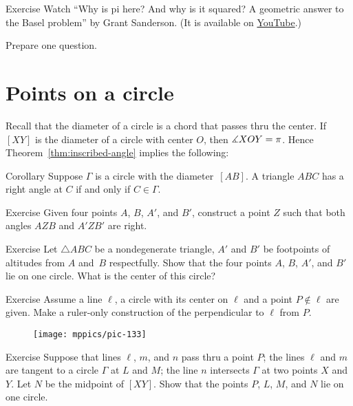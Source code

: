 \begin{thm}{Exercise}
Watch ``Why is pi here? And why is it squared? A geometric answer to the Basel problem'' by Grant Sanderson. (It is available on \href{https://youtu.be/d-o3eB9sfls}{YouTube}.) 

Prepare one question.
\end{thm}

\section{Points on a circle}

Recall that the diameter of a circle is a chord that passes thru the center.
If $[XY]$ is the diameter of a circle with center $O$, then $\measuredangle X O Y\z=\pi$. 
Hence Theorem~\ref{thm:inscribed-angle} implies the following:


\begin{thm}{Corollary}\label{cor:right-angle-diameter}
Suppose $\Gamma$ is a circle with the diameter~$[AB]$.
A triangle $ABC$ has a right angle at $C$ if and only if $C\in\Gamma$.
\end{thm}

\begin{thm}{Exercise}\label{ex:two-right}
Given four points $A$, $B$, $A'$, and $B'$,
construct a point $Z$ such that both angles $AZB$ and $A'ZB'$ are right.
\end{thm}

\begin{thm}{Exercise}\label{ex:VVAA}
Let $\triangle A B C$ be a nondegenerate triangle,
$A'$ and $B'$ be footpoints of altitudes from $A$ and~$B$ respectfully.
Show that the four points $A$, $B$, $A'$, and $B'$ lie on one circle.
What is the center of this circle?
\end{thm}

\begin{thm}{Exercise}\label{ex:perpendicular-ruler}
Assume a line $\ell$, 
a circle with its center on $\ell$ 
and a point $P\notin\ell$ are given.
Make a ruler-only construction of the perpendicular to $\ell$
from $P$.
\end{thm}

\begin{wrapfigure}{r}{32mm}
\vskip-4mm
\centering
\texttt{[image: mppics/pic-133]}
\end{wrapfigure}

\begin{thm}{Exercise}\label{ex:tnagents+midpoint}
Suppose that lines $\ell$, $m$, and $n$ pass thru a point $P$;
the lines $\ell$ and $m$ are tangent to a circle $\Gamma$ at $L$ and $M$;
the line $n$ intersects $\Gamma$ at two points $X$ and $Y$.
Let $N$ be the midpoint of $[XY]$.
Show that the points $P$, $L$, $M$, and $N$ lie on one circle.
\end{thm}

